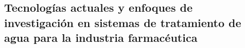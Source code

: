 \subsection{Tecnologías actuales y enfoques de investigación en sistemas de tratamiento de agua para la industria farmacéutica}



